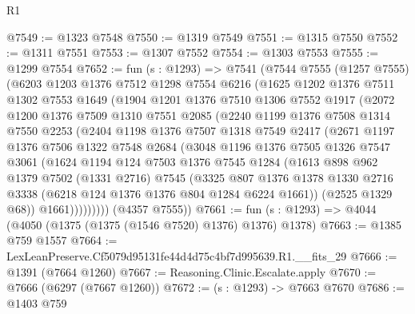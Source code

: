\begin{lexlean}{R1}
\begin{coremodule}
@7549 := @1323 @7548
@7550 := @1319 @7549
@7551 := @1315 @7550
@7552 := @1311 @7551
@7553 := @1307 @7552
@7554 := @1303 @7553
@7555 := @1299 @7554
@7652 := fun (s : @1293) =>
  @7541
    (@7544
      @7555
      (@1257 @7555)
      (@6203
        @1203
        @1376
        @7512
        @1298
        @7554
        @6216
        (@1625
          @1202
          @1376
          @7511
          @1302
          @7553
          @1649
          (@1904
            @1201
            @1376
            @7510
            @1306
            @7552
            @1917
            (@2072
              @1200
              @1376
              @7509
              @1310
              @7551
              @2085
              (@2240
                @1199
                @1376
                @7508
                @1314
                @7550
                @2253
                (@2404
                  @1198
                  @1376
                  @7507
                  @1318
                  @7549
                  @2417
                  (@2671
                    @1197
                    @1376
                    @7506
                    @1322
                    @7548
                    @2684
                    (@3048
                      @1196
                      @1376
                      @7505
                      @1326
                      @7547
                      @3061
                      (@1624
                        @1194
                        @124
                        @7503
                        @1376
                        @7545
                        @1284
                        (@1613
                          @898
                          @962
                          @1379
                          @7502
                          (@1331 @2716)
                          @7545
                          (@3325
                            @807
                            @1376
                            @1378
                            @1330
                            @2716
                            @3338
                            (@6218 @124 @1376 @1376 @804 @1284 @6224 @1661))
                          (@2525 @1329 @68))
                        @1661)))))))))
      (@4357 @7555))
@7661 := fun (s : @1293) => @4044 (@4050 (@1375 (@1375 (@1546 @7520) @1376) @1376) @1378)
@7663 := @1385 @759 @1557
@7664 := LexLeanPreserve.Cf5079d95131fe44d4d75c4bf7d995639.R1.__fits_29
@7666 := @1391 (@7664 @1260)
@7667 := Reasoning.Clinic.Escalate.apply
@7670 := @7666 (@6297 (@7667 @1260))
@7672 := (s : @1293) -> @7663 @7670
@7686 := @1403
    @759

\end{coremodule}
\end{lexlean}
